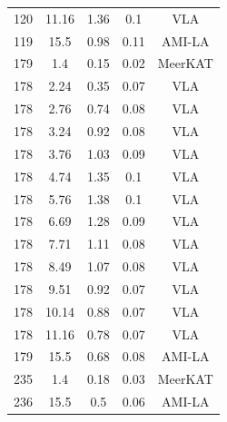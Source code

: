 \documentclass{nature_plusfigure}
\begin{document}
\begin{methods}
\begin{longtable}{|c|c|c|c|c|}
120&11.16&1.36&0.1&VLA\\%
119&15.5&0.98&0.11&AMI{-}LA\\%
\hline
179&1.4&0.15&0.02&MeerKAT\\%
178&2.24&0.35&0.07&VLA\\%
178&2.76&0.74&0.08&VLA\\%
178&3.24&0.92&0.08&VLA\\%
178&3.76&1.03&0.09&VLA\\%
178&4.74&1.35&0.1&VLA\\%
178&5.76&1.38&0.1&VLA\\%
178&6.69&1.28&0.09&VLA\\%
178&7.71&1.11&0.08&VLA\\%
178&8.49&1.07&0.08&VLA\\%
178&9.51&0.92&0.07&VLA\\%
178&10.14&0.88&0.07&VLA\\%
178&11.16&0.78&0.07&VLA\\%
179&15.5&0.68&0.08&AMI{-}LA\\%
\hline
235&1.4&0.18&0.03&MeerKAT\\%
236&15.5&0.5&0.06&AMI{-}LA\\%
\end{longtable}

\end{methods}
\end{document}
